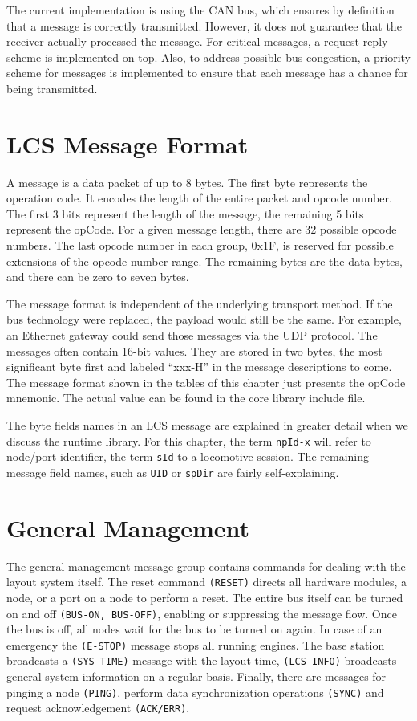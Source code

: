 The current implementation is using the CAN bus, which ensures by definition that a message is correctly transmitted. However, it does not guarantee that the receiver actually processed the message. For critical messages, a request-reply scheme is implemented on top. Also, to address possible bus congestion, a priority scheme for messages is implemented to ensure that each message has a chance for being transmitted.

\section{LCS Message Format}

A message is a data packet of up to 8 bytes. The first byte represents the operation code. It encodes the length of the entire packet and opcode number. The first 3 bits represent the length of the message, the remaining 5 bits represent the opCode. For a given message length, there are 32 possible opcode numbers. The last opcode number in each group, 0x1F, is reserved for possible extensions of the opcode number range. The remaining bytes are the data bytes, and there can be zero to seven bytes. 

The message format is independent of the underlying transport method. If the bus technology were replaced, the payload would still be the same. For example, an Ethernet gateway could send those messages via the UDP protocol. The messages often contain 16-bit values. They are stored in two bytes, the most significant byte first and labeled ``xxx-H'' in the message descriptions to come. The message format shown in the tables of this chapter just presents the opCode mnemonic. The actual value can be found in the core library include file.

The byte fields names in an LCS message are explained in greater detail when we discuss the runtime library. For this chapter, the term \texttt{npId-x} will refer to node/port identifier, the term \texttt{sId} to a locomotive session. The remaining message field names, such as \texttt{UID} or \texttt{spDir} are fairly self-explaining.

\section{General Management}

The general management message group contains commands for dealing with the layout system itself. The reset command \texttt{(RESET)} directs all hardware modules, a node, or a port on a node to perform a reset. The entire bus itself can be turned on and off \texttt{(BUS-ON, BUS-OFF)}, enabling or suppressing the message flow. Once the bus is off, all nodes wait for the bus to be turned on again. In case of an emergency the \texttt{(E-STOP)} message stops all running engines. The base station broadcasts a \texttt{(SYS-TIME)} message with the layout time, \texttt{(LCS-INFO)} broadcasts general system information on a regular basis. Finally, there are messages for pinging a node \texttt{(PING)}, perform data synchronization operations \texttt{(SYNC)} and request acknowledgement \texttt{(ACK/ERR)}.

